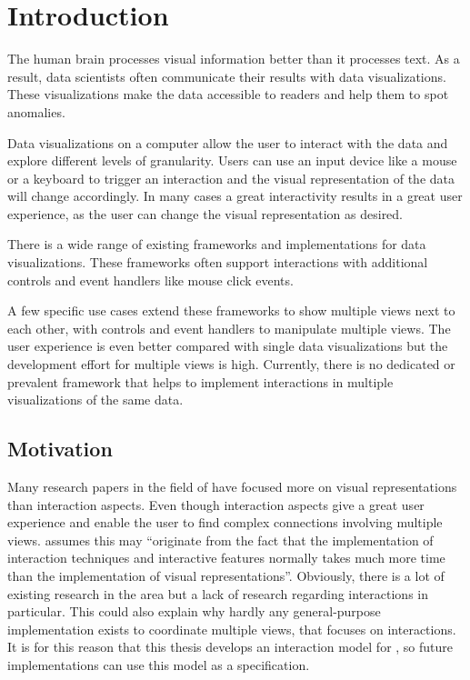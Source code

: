 \chapter{Introduction}
The human brain processes visual information better than it processes text.
As a result, data scientists often communicate their results with data visualizations.
These visualizations make the data accessible to readers and help them to spot anomalies.

Data visualizations on a computer allow the user to interact with the data and explore different levels of granularity.
Users can use an input device like a mouse or a keyboard to trigger an interaction and the visual representation of the data will change accordingly.
In many cases a great interactivity results in a great user experience, as the user can change the visual representation as desired.

There is a wide range of existing frameworks and implementations for data visualizations.
These frameworks often support interactions with additional controls and event handlers like mouse click events.

A few specific use cases extend these frameworks to show multiple views next to each other, with controls and event handlers to manipulate multiple views.
The user experience is even better compared with single data visualizations but the development effort for multiple views is high.
Currently, there is no dedicated or prevalent framework that helps to implement interactions in multiple visualizations of the same data.


\section{Motivation}\label{sec:outline}
Many research papers in the field of \cmvs{} have focused more on visual representations than interaction aspects.
Even though interaction aspects give a great user experience and enable the user to find complex connections involving multiple views.
\textcite{Ho2013} assumes this may ``originate from the fact that the implementation of interaction techniques and interactive features normally takes much more time than the implementation of visual representations''.
Obviously, there is a lot of existing research in the area but a lack of research regarding interactions in particular.
This could also explain why hardly any general-purpose implementation exists to coordinate multiple views, that focuses on interactions.
It is for this reason that this thesis develops an interaction model for \cmvs{}, so future implementations can use this model as a specification.

